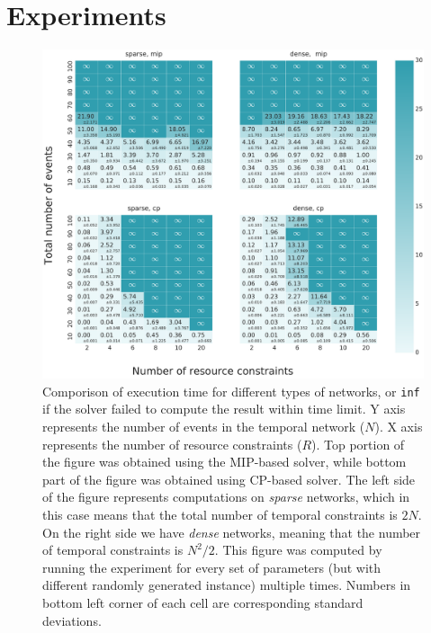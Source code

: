 \section{Experiments}

\begin{figure}
\begin{center}
\includegraphics[width=\textwidth]{execution_time_std}
\caption{Comporison of execution time for different types of networks, or \texttt{inf} if the solver failed to compute the result within time limit. Y axis represents the number of events in the temporal network ($N$). X axis represents the number of resource constraints ($R$). Top portion of the figure was obtained using the MIP-based solver, while bottom part of the figure was obtained using CP-based solver. The left side of the figure represents computations on \textit{sparse} networks, which in this case means that the total number of temporal constraints is $2N$. On the right side we have \textit{dense} networks, meaning that the number of temporal constraints is $N^2/2$. This figure was computed by running the experiment for every set of parameters (but with different randomly generated instance) multiple times. Numbers in bottom left corner of each cell are corresponding standard deviations.}
\label{fig:execution_time}
\end{center}
\end{figure}

